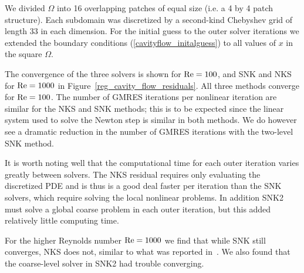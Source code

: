 We divided $\Omega$ into 16 overlapping patches of equal size (i.e. a 4 by 4 patch structure). Each subdomain was discretized by a second-kind Chebyshev grid of length 33 in each dimension. For the initial guess to the outer solver iterations we extended the boundary conditions (\ref{cavityflow_initalguess}) to all values of $x$ in the square $\Omega$. 

The convergence of the three solvers is shown for $\text{Re}=100$, and SNK and NKS for $\text{Re} = 1000$ in Figure~\ref{reg_cavity_flow_residuals}. All three methods converge for $\text{Re} = 100$. The number of GMRES iterations per nonlinear iteration are similar for the NKS and SNK methods; this is to be expected since the linear system used to solve the Newton step is similar in both methods. We do however see a dramatic reduction in the number of GMRES iterations with the two-level SNK method. 

It is worth noting well that the computational time for each outer iteration varies greatly between solvers. The NKS residual requires only evaluating the discretized PDE and is thus is a good deal faster per iteration than the SNK solvers, which require solving the local nonlinear problems. In addition SNK2 must solve a global coarse problem in each outer iteration, but this added relatively little computing time. 

For the higher Reynolds number $\text{Re} = 1000$ we find that while SNK still converges, NKS does not, similar to what was reported in~\cite{Cai2002}. We also found that the coarse-level solver in SNK2 had trouble converging. 


